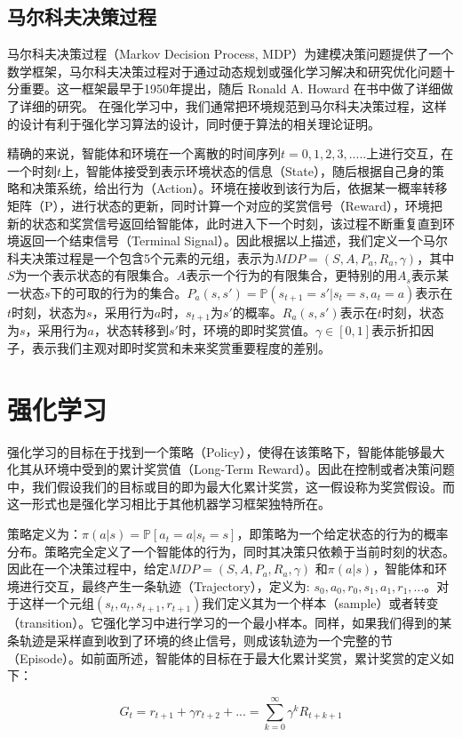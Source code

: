 \documentclass{standalone}
\begin{document}
\subsection{马尔科夫决策过程}
马尔科夫决策过程（Markov Decision Process, MDP）为建模决策问题提供了一个数学框架，马尔科夫决策过程对于通过动态规划或强化学习解决和研究优化问题十分重要。这一框架最早于1950年提出，随后 Ronald A. Howard 在书中做了详细做了详细的研究。
在强化学习中，我们通常把环境规范到马尔科夫决策过程，这样的设计有利于强化学习算法的设计，同时便于算法的相关理论证明。\par
精确的来说，智能体和环境在一个离散的时间序列$t=0,1,2,3,... ..$上进行交互，在一个时刻$t$上，智能体接受到表示环境状态的信息（State），随后根据自己身的策略和决策系统，给出行为（Action）。环境在接收到该行为后，依据某一概率转移矩阵（P），进行状态的更新，同时计算一个对应的奖赏信号（Reward），环境把新的状态和奖赏信号返回给智能体，此时进入下一个时刻，该过程不断重复直到环境返回一个结束信号（Terminal Signal）。因此根据以上描述，我们定义一个马尔科夫决策过程是一个包含5个元素的元组，表示为$MDP=(S, A, P_{a}, R_{a}, \gamma)$，其中$S$为一个表示状态的有限集合。$A$表示一个行为的有限集合，更特别的用$A_s$表示某一状态$s$下的可取的行为的集合。$P_a(s, s') = \mathbb{P}(s_{t+1} = s'|s_t = s, a_t=a)$表示在$t$时刻，状态为$s$，采用行为$a$时，$s_{t+1}$为$s'$的概率。$R_a(s, s')$表示在$t$时刻，状态为$s$，采用行为$a$，状态转移到$s'$时，环境的即时奖赏值。$\gamma \in [0, 1]$表示折扣因子，表示我们主观对即时奖赏和未来奖赏重要程度的差别。\par 

\section{强化学习}
强化学习的目标在于找到一个策略（Policy），使得在该策略下，智能体能够最大化其从环境中受到的累计奖赏值（Long-Term Reward）。因此在控制或者决策问题中，我们假设我们的目标或目的即为最大化累计奖赏，这一假设称为奖赏假设。而这一形式也是强化学习相比于其他机器学习框架独特所在。\par
策略定义为：$\pi(a|s) = \mathbb{P}[a_t=a | s_t=s]$，即策略为一个给定状态的行为的概率分布。策略完全定义了一个智能体的行为，同时其决策只依赖于当前时刻的状态。
因此在一个决策过程中，给定$MDP=(S, A, P_{a}, R_{a}, \gamma)$ 和$\pi(a|s)$，智能体和环境进行交互，最终产生一条轨迹（Trajectory），定义为: $s_0, a_0, r_0, s_1, a_1, r_1, ...$。对于这样一个元组$(s_t, a_t, s_{t+1}, r_{t+1})$我们定义其为一个样本（sample）或者转变（transition）。它强化学习中进行学习的一个最小样本。同样，如果我们得到的某条轨迹是采样直到收到了环境的终止信号，则成该轨迹为一个完整的节（Episode）。如前面所述，智能体的目标在于最大化累计奖赏，累计奖赏的定义如下：
\begin{center}
    \begin{equation}
        G_t=r_{t+1} + \gamma r_{t+2}+... = \sum_{k=0}^{\infty}\gamma^{k}R_{t+k+1}
    \end{equation}
\end{center}
\end{document}
